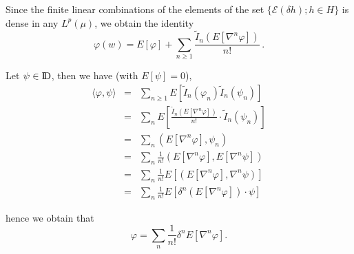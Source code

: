 \documentclass[12pt,a4paper]{book}
\newcommand{\DD}{{\rm I\!D}}
\begin{document}
\noindent
Since the finite linear combinations of the elements of the set
$\{{\mathcal E}(\delta h);h\in H\}$ is dense in any $L^p(\mu)$, we obtain
the identity
$$
\varphi(w)=E[\varphi]+\sum_{n\geq1} \frac{{\tilde{I}}_n(E[\nabla^n\varphi])}{n!}\,.
$$

Let $\psi\in \DD$, then we have (with $E[\psi]=0$),
\begin{eqnarray*}
\langle\varphi,\psi\rangle & = & \sum_{n\geq 1}E[{\tilde{I}}_n(\varphi_n){\tilde{I}}_n(\psi_n)] \\
& = & \sum_{n}E\left[ \frac{{\tilde{I}}_n(E[\nabla^n\varphi])}{n!}\cdot
     {\tilde{I}}_n(\psi_n)\right]  \\
& = & \sum_n(E[\nabla^n\varphi],\psi_n) \\
& = & \sum_n \frac{1}{n!} (E[\nabla^n\varphi],E[\nabla^n\psi]) \\
& = & \sum_n\frac{1}{n!}E[(E[\nabla^n\varphi],\nabla^n\psi)] \\
& = & \sum_{n}\frac{1}{n!}E[\delta^n(E[\nabla^n\varphi])\cdot\psi]
\end{eqnarray*}

\noindent
hence we obtain that
$$
\varphi=\sum_n\frac{1}{n!}\delta^n E[\nabla^n\varphi].
$$
\end{document}

